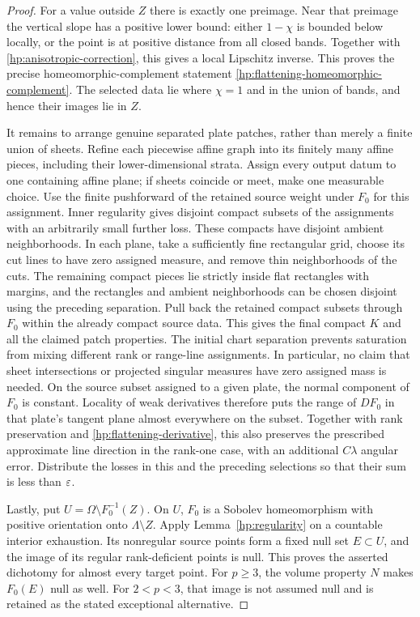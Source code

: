 \begin{proof}
For a value outside $Z$ there is exactly one preimage.  Near that
preimage the vertical slope has a positive lower bound: either
$1-\chi$ is bounded below locally, or the point is at positive
distance from all closed bands.  Together with
\eqref{hp:anisotropic-correction}, this gives a local Lipschitz
inverse.  This proves the precise homeomorphic-complement statement
\eqref{hp:flattening-homeomorphic-complement}.  The selected data
lie where $\chi=1$ and in the union of bands, and hence their images
lie in $Z$.

It remains to arrange genuine separated plate patches, rather than
merely a finite union of sheets.  Refine each piecewise affine graph
into its finitely many affine pieces, including their lower-dimensional
strata.  Assign every output datum to one containing affine plane;
if sheets coincide or meet, make one measurable choice.  Use the
finite pushforward of the retained source weight under $F_0$ for
this assignment.  Inner regularity gives disjoint compact subsets
of the assignments with an arbitrarily small further loss.  These
compacts have disjoint ambient neighborhoods.  In each plane, take
a sufficiently fine rectangular grid, choose its cut lines to have
zero assigned measure, and remove thin neighborhoods of the cuts.
The remaining compact pieces lie strictly inside flat rectangles
with margins, and the rectangles and ambient neighborhoods can be
chosen disjoint using the preceding separation.  Pull back the
retained compact subsets through $F_0$ within the already compact
source data.  This gives the final compact $K$ and all the claimed
patch properties.  The initial chart separation prevents saturation
from mixing different rank or range-line assignments.  In particular,
no claim that sheet intersections or projected singular measures
have zero assigned mass is needed.  On the source subset assigned
to a given plate, the normal component of $F_0$ is constant.
Locality of weak derivatives therefore puts the range of $DF_0$
in that plate's tangent plane almost everywhere on the subset.
Together with rank preservation and
\eqref{hp:flattening-derivative}, this also preserves the prescribed
approximate line direction in the rank-one case, with an additional
$C\lambda$ angular error.  Distribute the losses in this
and the preceding selections so that their sum is less than $\varepsilon$.

Lastly, put $U=\Omega\setminus F_0^{-1}(Z)$.  On $U$, $F_0$ is a
Sobolev homeomorphism with positive orientation onto
$\Lambda\setminus Z$.  Apply Lemma~\ref{hp:regularity} on a
countable interior exhaustion.  Its nonregular source points form
a fixed null set $E\subset U$, and the image of its regular
rank-deficient points is null.  This proves the asserted dichotomy
for almost every target point.  For $p\ge3$, the volume property
$N$ makes $F_0(E)$ null as well.  For $2<p<3$, that image is not
assumed null and is retained as the stated exceptional alternative.
\end{proof}


